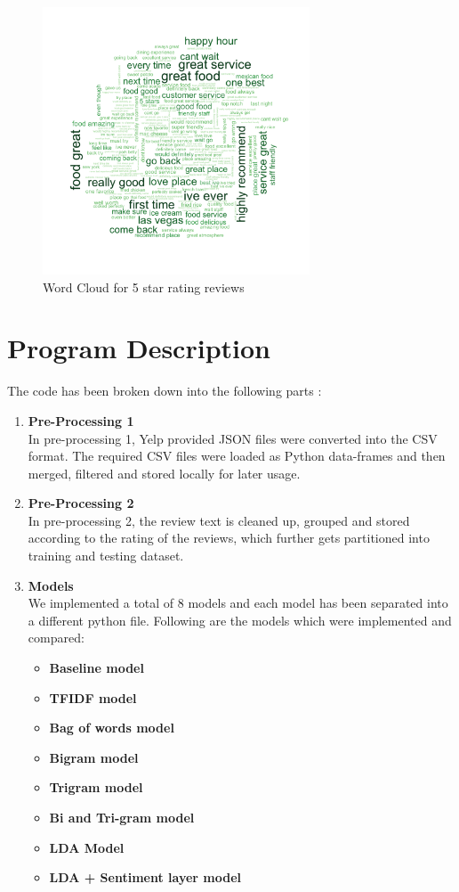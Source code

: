 \documentclass[paper=a4, fontsize=11pt]{scrartcl} %
\numberwithin{equation}{section} %
\numberwithin{figure}{section} %
\numberwithin{table}{section} %
\begin{document}
\begin{figure}[!htb]
\centering
\includegraphics[width=300px, height = 300px]{5_star_wordcloud_500k.png}
\caption{Word Cloud for 5 star rating reviews}
\label{wc5}
\end{figure} 


\section{Program Description}
The code has been broken down into the following parts : 

\begin{enumerate}
\item \textbf{Pre-Processing 1}\\
In pre-processing 1, Yelp provided JSON files were converted into the CSV format. The required CSV files were loaded as Python data-frames and then merged, filtered and stored locally for later usage.

\item \textbf{Pre-Processing 2}\\
In pre-processing 2, the review text is cleaned up, grouped and stored according to the rating of the reviews, which further gets partitioned into training and testing dataset.

\item	\textbf{Models}\\
We implemented a total of 8 models and each model has been separated into a different python file. Following are the models which were implemented and compared:
\begin{itemize}
\item \textbf{Baseline model}
\item \textbf{TFIDF model}
\item \textbf{Bag of words model}
\item \textbf{Bigram model}
\item \textbf{Trigram model}
\item \textbf{Bi and Tri-gram model}
\item \textbf{LDA Model}
\item \textbf{LDA + Sentiment layer model}
\end{itemize}
\end{enumerate}
\end{document}
